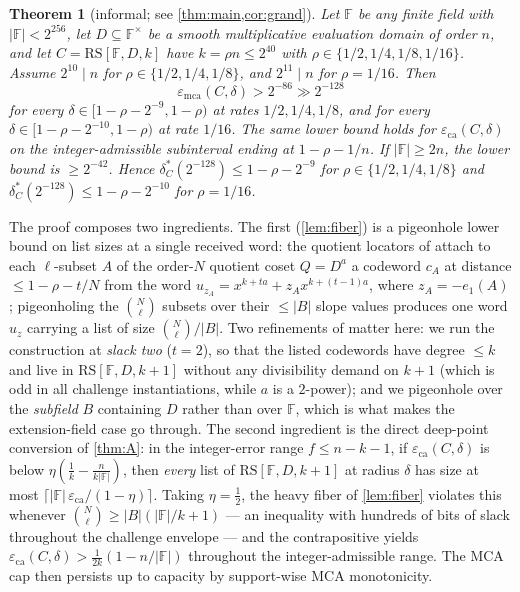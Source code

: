 \documentclass[11pt]{article}
\newtheorem{theorem}{Theorem}[section]
\theoremstyle{definition}
\theoremstyle{remark}
\newcommand{\F}{\mathbb{F}}
\newcommand{\B}{B}
\newcommand{\RS}{\mathrm{RS}}
\newcommand{\eca}{\varepsilon_{\mathrm{ca}}}
\newcommand{\emca}{\varepsilon_{\mathrm{mca}}}
\newcommand{\eone}{e_1}
\begin{document}
\begin{theorem}[informal; see \cref{thm:main,cor:grand}]\label{thm:informal}
Let $\F$ be any finite field with $|\F|<2^{256}$, let $D\subseteq\F^\times$ be a smooth multiplicative evaluation domain of order $n$, and let $C=\RS[\F,D,k]$ have $k=\rho n\le2^{40}$ with $\rho\in\{1/2,1/4,1/8,1/16\}$. Assume $2^{10}\mid n$ for $\rho\in\{1/2,1/4,1/8\}$, and $2^{11}\mid n$ for $\rho=1/16$. Then
\[
\emca(C,\delta)>2^{-86}\gg2^{-128}
\]
for every $\delta\in[1-\rho-2^{-9},1-\rho)$ at rates $1/2,1/4,1/8$, and for every $\delta\in[1-\rho-2^{-10},1-\rho)$ at rate $1/16$. The same lower bound holds for $\eca(C,\delta)$ on the integer-admissible subinterval ending at $1-\rho-1/n$. If $|\F|\ge2n$, the lower bound is $\ge2^{-42}$. Hence $\delta^*_C(2^{-128})\le1-\rho-2^{-9}$ for $\rho\in\{1/2,1/4,1/8\}$ and $\delta^*_C(2^{-128})\le1-\rho-2^{-10}$ for $\rho=1/16$.
\end{theorem}

The proof composes two ingredients. The first (\cref{lem:fiber}) is a pigeonhole lower bound on list sizes at a single received word: the quotient locators of \cite{Cho26a} attach to each $\ell$-subset $A$ of the order-$N$ quotient coset $Q=D^{a}$ a codeword $c_A$ at distance $\le1-\rho-t/N$ from the word $u_{z_A}=x^{k+ta}+z_Ax^{k+(t-1)a}$, where $z_A=-\eone(A)$; pigeonholing the $\binom N\ell$ subsets over their $\le|\B|$ slope values produces one word $u_z$ carrying a list of size $\binom N\ell/|\B|$. Two refinements of \cite[Main Thm.\,(d)]{Cho26a} matter here: we run the construction at \emph{slack two} ($t=2$), so that the listed codewords have degree $\le k$ and live in $\RS[\F,D,k+1]$ without any divisibility demand on $k+1$ (which is odd in all challenge instantiations, while $a$ is a $2$-power); and we pigeonhole over the \emph{subfield} $\B$ containing $D$ rather than over $\F$, which is what makes the extension-field case go through. The second ingredient is the direct deep-point conversion of \cref{thm:A}: in the integer-error range $f\le n-k-1$, if $\eca(C,\delta)$ is below $\eta(\frac1k-\frac n{k|\F|})$, then \emph{every} list of $\RS[\F,D,k+1]$ at radius $\delta$ has size at most $\lceil|\F|\,\eca/(1-\eta)\rceil$. Taking $\eta=\frac12$, the heavy fiber of \cref{lem:fiber} violates this whenever $\binom N\ell\ge|\B|(|\F|/k+1)$ --- an inequality with hundreds of bits of slack throughout the challenge envelope --- and the contrapositive yields $\eca(C,\delta)>\frac1{2k}(1-n/|\F|)$ throughout the integer-admissible range. The MCA cap then persists up to capacity by support-wise MCA monotonicity.
\end{document}
